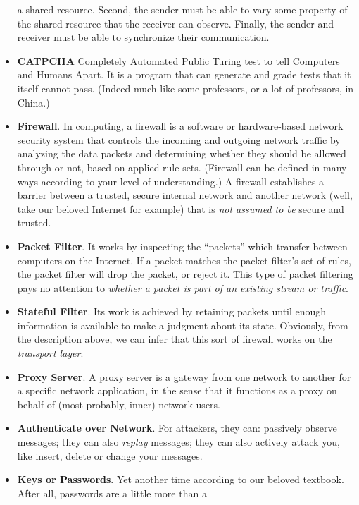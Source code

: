 \documentclass[twocolumn]{article}
\begin{document}
\begin{itemize}
  a shared resource. Second, the sender must be able to vary some
  property of the shared resource that the receiver can
  observe. Finally, the sender and receiver must be able to
  synchronize their communication. 
\item \textbf{CATPCHA} Completely Automated Public Turing test to tell
  Computers and Humans Apart. It is a program that can generate and
  grade tests that it itself cannot pass. (Indeed much like some
  professors, or a lot of professors, in China.)
\item \textbf{Firewall}. In computing, a firewall is a software or
  hardware-based network security system that controls the incoming
  and outgoing network traffic by analyzing the data packets and
  determining whether they should be allowed through or not, based on
  applied rule sets. (Firewall can be defined in many ways according
  to your level of understanding.) A firewall establishes a barrier
  between a trusted, secure internal network and another network
  (well, take our beloved Internet for example) that is \emph{not
    assumed to be} secure and trusted. 
\item \textbf{Packet Filter}. It works by inspecting the ``packets''
  which transfer between computers on the Internet. If a packet
  matches the packet filter's set of rules, the packet filter will
  drop the packet, or reject it. This type of packet filtering pays no
  attention to \emph{whether a packet is part of an existing stream or
  traffic}.
\item \textbf{Stateful Filter}. Its work is achieved by retaining
  packets until enough information is available to make a judgment
  about its state. Obviously, from the description above, we can infer
  that this sort of firewall works on the \emph{transport layer}.
\item \textbf{Proxy Server}. A proxy server is a gateway from one
  network to another for a specific network application, in the sense
  that it functions as a proxy on behalf of (most probably, inner)
  network users.
\item \textbf{Authenticate over Network}. For attackers, they can:
  passively observe messages; they can also \emph{replay} messages;
  they can also actively attack you, like insert, delete or change
  your messages. 
\item \textbf{Keys or Passwords}. Yet another time according to our
  beloved textbook. After all, passwords are a little more than a

\end{itemize}
\end{document}
